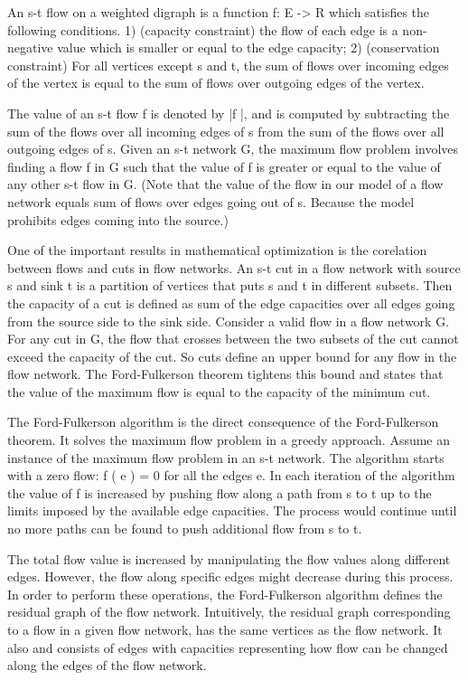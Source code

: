 \documentclass{llncs}
\begin{document}
An s-t flow on a weighted digraph is a function f: E -> R which satisfies the following conditions. 1) (capacity constraint) the flow of
each edge is a non-negative value which is smaller or equal to the edge capacity; 2) (conservation constraint) For all vertices except s and t, the sum of flows over incoming edges of the vertex is equal to the sum of flows over outgoing edges of the vertex.

The value of an s-t flow f is denoted by |f |, and is computed by subtracting the sum of the flows over all incoming edges of s from the sum of the flows over all outgoing edges of s. Given an s-t network G, the maximum flow problem involves finding a flow f in G such that the value of f is greater or equal to the value of any other s-t flow in G. (Note that the value of the flow in our model of a flow network equals sum of flows over edges going out of s. Because the model prohibits edges coming into the source.)

One of the important results in mathematical optimization is the corelation between flows and cuts in flow networks. An s-t cut in a flow network with source s and sink t is a partition of vertices that puts s and t in different subsets. Then the capacity of a cut is defined as sum of the edge capacities over all edges going from the source side to the sink side. Consider a valid flow in a flow network G. For any cut in G, the flow that crosses between the two subsets of the cut cannot exceed the capacity of the cut. So cuts define an upper bound for any flow in the flow network. The Ford-Fulkerson theorem tightens this bound and states that the value of the maximum flow is equal to the capacity of the minimum cut.

The Ford-Fulkerson algorithm is the direct consequence of the Ford-Fulkerson theorem. It solves the maximum flow problem in a greedy approach. Assume an instance of the maximum flow problem in an s-t network. The algorithm starts with a zero flow: f ( e ) = 0 for all the edges e. In each iteration of the algorithm the value of f is increased by pushing flow along a path from s to t up to the limits imposed by the available edge capacities. The process would continue until no more paths can be found to push additional flow from s to t.

The total flow value is increased by manipulating the flow values along different edges. However, the flow along specific edges might decrease during this process. In order to perform these operations, the Ford-Fulkerson algorithm defines the residual graph of the flow network. Intuitively, the residual graph corresponding to a flow in a given flow network, has the same vertices as the flow network. It also and consists of edges with capacities representing how flow can be changed along the edges of the flow network.
\end{document}
